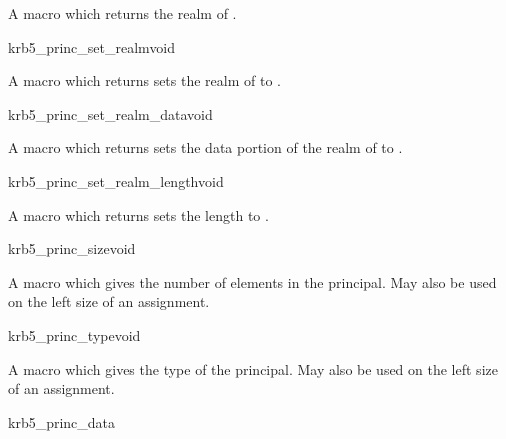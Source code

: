 A macro which returns the realm of .

\begin{funcdecl}{krb5_princ_set_realm}{void}{\funcinout}
\end{funcdecl}

A macro which returns sets the realm of  to
. 

\begin{funcdecl}{krb5_princ_set_realm_data}{void}{\funcinout}
\end{funcdecl}

\internalfunc

A macro which returns sets the data portion of the realm of
 to . 

\begin{funcdecl}{krb5_princ_set_realm_length}{void}{\funcinout}
\end{funcdecl}

\internalfunc

A macro which returns sets the length  to
. 

\begin{funcdecl}{krb5_princ_size}{void}{\funcinout}
\end{funcdecl}

\internalfunc

A macro which gives the number of elements in the principal.
May also be used on the left size of an assignment.

\begin{funcdecl}{krb5_princ_type}{void}{\funcinout}
\end{funcdecl}

\internalfunc

A macro which gives the type of the principal.
May also be used on the left size of an assignment.

\begin{funcdecl}{krb5_princ_data}{}
\end{funcdecl}

